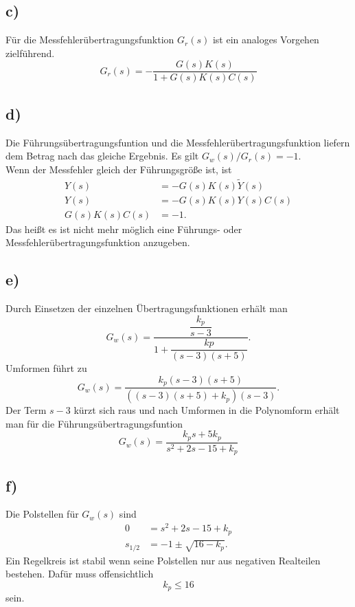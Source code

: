 \documentclass[11pt]{scrartcl} %
\begin{document}
\subsection*{c)}
Für die Messfehlerübertragungsfunktion $G_r(s)$ ist ein analoges Vorgehen zielführend.
\begin{equation*}
G_r(s)=- \dfrac{G(s)K(s)}{1+G(s)K(s)C(s)}
\end{equation*}
\subsection*{d)}
Die Führungsübertragungsfuntion und die Messfehlerübertragungsfunktion liefern dem Betrag nach das gleiche Ergebnis. Es gilt $G_w(s)/G_r(s) = -1$. \\
Wenn der Messfehler gleich der Führungsgröße ist, ist
\begin{align*}
Y(s) &= - G(s)K(s)\tilde{Y}(s)\\
Y(s) &= - G(s)K(s)Y(s)C(s)\\
G(s)K(s)C(s) &= - 1.
\end{align*}
Das heißt es ist nicht mehr möglich eine Führungs- oder Messfehlerübertragungsfunktion anzugeben.
\subsection*{e)}
Durch Einsetzen der einzelnen Übertragungsfunktionen erhält man
\begin{equation*}
G_w(s)=\dfrac{\dfrac{k_p}{s-3}}{1+\dfrac{kp}{\left(s-3\right)\left(s+5\right)}}.
\end{equation*}
Umformen führt zu
\begin{equation*}
G_w(s)=\dfrac{k_p\left(s-3\right)\left(s+5\right)}{\left(\left(s-3\right)\left(s+5\right)+k_p\right)\left(s-3\right)}.
\end{equation*}
Der Term $s-3$ kürzt sich raus und nach Umformen in die Polynomform erhält man für die Führungsübertragungsfuntion
\begin{equation*}
G_w(s)=\dfrac{k_ps+5k_p}{s^2+2s-15+k_p}
\end{equation*}

\subsection*{f)}
Die Polstellen für $G_w(s)$ sind
\begin{align*}
0&=s^2+2s-15+k_p\\
s_{1/2}&=-1\pm\sqrt{16-k_p}.
\end{align*}
Ein Regelkreis ist stabil wenn seine Polstellen nur aus negativen Realteilen bestehen. Dafür muss offensichtlich
\begin{equation*}
k_p \leq 16
\end{equation*}
sein.
\end{document}
